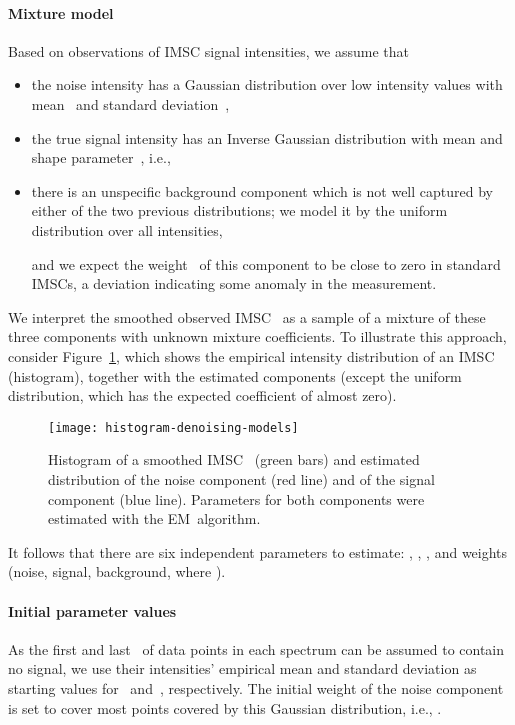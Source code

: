 \documentclass{article}
\begin{document}
\paragraph{Mixture model}
Based on observations of IMSC signal intensities, we assume that
\begin{itemize}
\item the noise intensity has a Gaussian distribution over low intensity values with mean~ and standard deviation~,

\item the true signal intensity has an Inverse Gaussian distribution with mean  and shape parameter~, i.e.,

\item there is an unspecific background component which is not well captured by either of the two previous distributions; we model it by the uniform distribution over all intensities,

and we expect the weight~ of this component to be close to zero in standard IMSCs, a deviation indicating some anomaly in the measurement.
\end{itemize}

We interpret the smoothed observed IMSC~ as a sample of a mixture of these three components with unknown mixture coefficients.
To illustrate this approach, consider Figure~\ref{fig:denoisingmodels}, which shows the empirical intensity distribution of an IMSC (histogram), together with the estimated components (except the uniform distribution, which has the expected coefficient of almost zero).
\begin{figure}[t]
  \centering
  \texttt{[image: histogram-denoising-models]}
  \caption{Histogram of a smoothed IMSC~ (green bars) and estimated distribution of the noise component (red line) and of the signal component (blue line). 
Parameters for both components were estimated with the EM~algorithm.}
  \label{fig:denoisingmodels}
\end{figure}

It follows that there are six independent parameters to estimate: , , ,  and weights  (noise, signal, background, where ).

\paragraph{Initial parameter values}
As the first and last~ of data points in each spectrum can be assumed to contain no signal, we use their intensities' empirical mean and standard deviation as starting values for~ and~, respectively.
The initial weight of the noise component is set to cover most points covered by this Gaussian distribution, i.e., .
\end{document}
